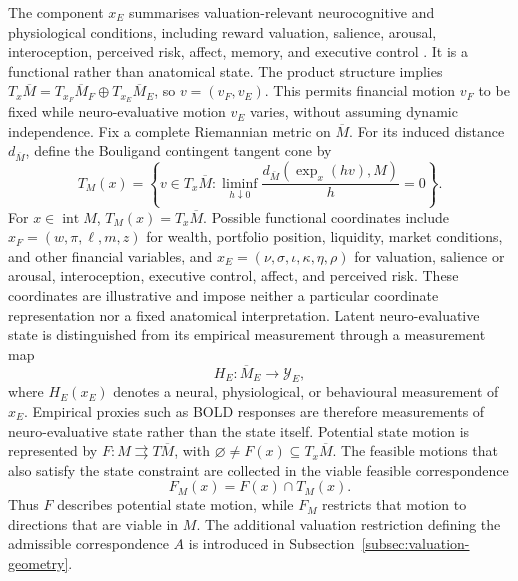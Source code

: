 \documentclass[graybox,natbib]{SNmult}
\providecommand{\1}{}
\renewcommand{\1}{\mathbbm 1}
\begin{document}
The component \(x_E\) summarises valuation-relevant neurocognitive and
physiological conditions, including reward valuation, salience, arousal,
interoception, perceived risk, affect, memory, and executive control
\citep{KnutsonAdamsFongHommer2001,KuhnenKnutson2005,
PreuschoffBossaertsQuartz2006,TomFoxTrepelPoldrack2007,
PreuschoffQuartzBossaerts2008,Wittmann2013,
MiendlarzewskaKometerPreuschoff2019}. It is a functional rather than
anatomical state. The product structure implies
\(T_x\overline M=T_{x_F}\overline M_F\oplus T_{x_E}\overline M_E\), so
\(v=(v_F,v_E)\). This permits financial motion \(v_F\) to be fixed while
neuro-evaluative motion \(v_E\) varies, without assuming dynamic independence.
Fix a complete Riemannian metric on \(\overline M\). For its induced distance
\(d_{\overline M}\), define the Bouligand contingent tangent cone by
\begin{equation}
T_M(x)
=
\left\{
v\in T_x\overline M:
\liminf_{h\downarrow0}
\frac{d_{\overline M}(\exp_x(hv),M)}{h}=0
\right\}.
\label{eq:contingent-cone}
\end{equation}
For \(x\in\operatorname{int}M\), \(T_M(x)=T_x\overline M\). Possible
functional coordinates include
\(x_F=(w,\pi,\ell,m,z)\) for wealth, portfolio position, liquidity, market
conditions, and other financial variables, and
\(x_E=(\nu,\sigma,\iota,\kappa,\eta,\rho)\) for valuation, salience or arousal,
interoception, executive control, affect, and perceived risk. These coordinates
are illustrative and impose neither a particular coordinate representation nor
a fixed anatomical interpretation. Latent neuro-evaluative state is
distinguished from its empirical measurement through a measurement map
\[
H_E:\overline M_E\longrightarrow\mathcal Y_E,
\]
where \(H_E(x_E)\) denotes a neural, physiological, or behavioural measurement
of \(x_E\). Empirical proxies such as BOLD responses are therefore measurements
of neuro-evaluative state rather than the state itself. Potential state motion is
represented by
\(F:M\rightrightarrows T\overline M\), with
\(\varnothing\neq F(x)\subseteq T_x\overline M\). The feasible motions that
also satisfy the state constraint are collected in the viable feasible
correspondence
\[
F_M(x)
=
F(x)\cap T_M(x).
\]
Thus \(F\) describes potential state motion, while \(F_M\) restricts that
motion to directions that are viable in \(M\). The additional valuation
restriction defining the admissible correspondence \(A\) is introduced in
Subsection~\ref{subsec:valuation-geometry}.

\medskip
\end{document}
